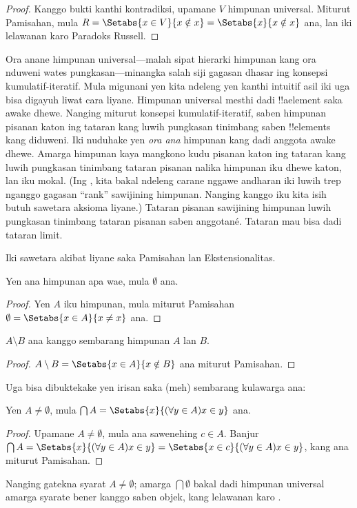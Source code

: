 \documentclass[../../../include/open-logic-section]{subfiles}
\begin{document}
\begin{proof}
Kanggo bukti kanthi kontradiksi, upamane $V$ himpunan universal.
Miturut Pamisahan, mula $R =
\Setabs{x \in V}{x \notin x} = \Setabs{x}{x \notin x}$ ana,
lan iki lelawanan karo Paradoks Russell.
\end{proof}

Ora anane himpunan universal---malah sipat hierarki himpunan kang ora nduweni wates pungkasan---minangka salah siji gagasan dhasar
ing konsepsi kumulatif-iteratif. Mula migunani yen kita
ndeleng yen kanthi intuitif asil iki uga bisa digayuh
liwat cara liyane. Himpunan universal mesthi dadi
!!a{element} saka awake dhewe. Nanging miturut konsepsi
kumulatif-iteratif, saben himpunan pisanan katon ing
tataran kang luwih pungkasan tinimbang saben !!{element}s kang diduweni.
Iki nuduhake yen \emph{ora ana} himpunan kang dadi anggota
awake dhewe. Amarga himpunan kaya mangkono kudu pisanan
katon ing tataran kang luwih pungkasan tinimbang tataran
pisanan nalika himpunan iku dhewe katon, lan iku mokal.
(Ing , kita bakal
ndeleng carane nggawe andharan iki luwih trep nganggo
gagasan ``rank'' sawijining himpunan. Nanging kanggo iku
kita isih butuh sawetara aksioma liyane.)
Tataran pisanan sawijining himpunan luwih pungkasan tinimbang tataran pisanan saben anggotané. Tataran mau bisa dadi tataran limit.

Iki sawetara akibat liyane saka Pamisahan lan Ekstensionalitas.

\begin{prop}
Yen ana himpunan apa wae, mula $\emptyset$ ana.
\end{prop}

\begin{proof}
Yen $A$ iku himpunan, mula miturut Pamisahan
$\emptyset = \Setabs{x \in A}{x \neq x}$ ana.
\end{proof}

\begin{prop}
$A \setminus B$ ana kanggo sembarang himpunan $A$ lan $B$.
\end{prop}

\begin{proof}
$A \setminus B = \Setabs{x \in A}{x \notin B}$ ana miturut Pamisahan.
\end{proof}

Uga bisa dibuktekake yen irisan saka (meh) sembarang kulawarga ana:

\begin{prop}
Yen $A \neq \emptyset$, mula $\bigcap A = \Setabs{x}{(\forall y \in A)x \in y}$ ana.
\end{prop}

\begin{proof}
Upamane $A \neq \emptyset$, mula ana sawenehing $c \in A$.
Banjur $\bigcap A =
\Setabs{x}{(\forall y \in A)x \in y} = \Setabs{x \in c}{(\forall y \in
A)x \in y}$, kang ana miturut Pamisahan.
\end{proof}

Nanging gatekna syarat $A \neq \emptyset$; amarga $\bigcap
\emptyset$ bakal dadi himpunan universal amarga syarate bener kanggo saben objek,
kang lelawanan karo .
\end{document}
